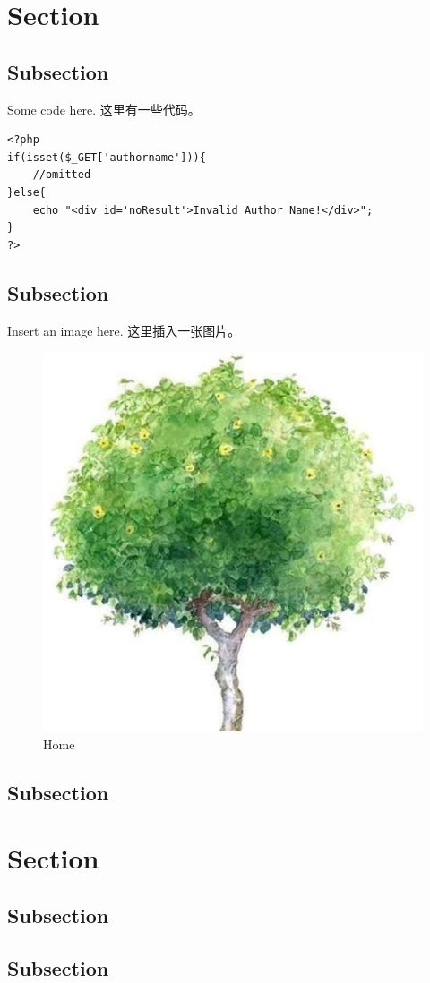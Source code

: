 \documentclass[a4paper]{article}
\begin{document}
    \tableofcontents
    \newpage
    \section{Section}
        \subsection{Subsection}
            Some code here.
            这里有一些代码。
            \begin{verbatim}
<?php
if(isset($_GET['authorname'])){
    //omitted
}else{
    echo "<div id='noResult'>Invalid Author Name!</div>";
}
?>
            \end{verbatim}
        \subsection{Subsection}
            Insert an image here.
            这里插入一张图片。
            \begin{figure}[H]
            \centering
            \includegraphics[width=.5\textwidth]{img/example.png}
            \caption{Home}
            \end{figure}
        \subsection{Subsection}
    \section{Section}
        \subsection{Subsection}
        \subsection{Subsection}
\end{document}

